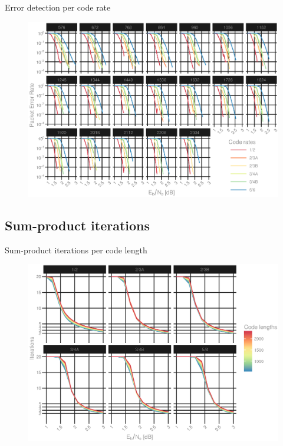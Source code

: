 \documentclass{beamer}
\begin{document}
\begin{darkframes}
  \begin{frame}{Error detection per code rate}
    \begin{figure}[h]
      \centering
      \vspace{-2mm}%
      \hspace{-6mm}%
      \includegraphics[width=1.05\textwidth]{figures/Pe_vs_SNR_per_rate.eps}
    \end{figure}
  \end{frame}

  \subsection{Sum-product iterations}
  \begin{frame}{Sum-product iterations per code length}
    \begin{figure}[h]
      \centering
      \includegraphics[width=\textwidth]{figures/iters_vs_SNR_per_length.eps}
    \end{figure}
  \end{frame}


\end{darkframes}
\end{document}
